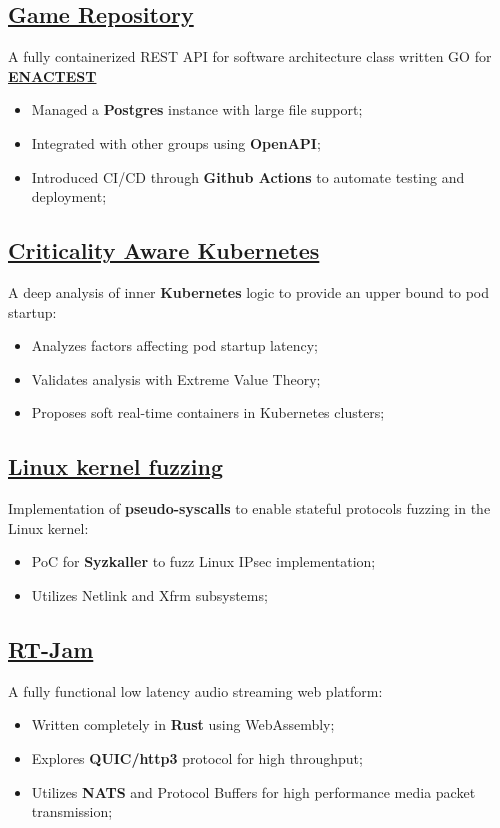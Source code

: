 \documentclass[10pt,a4paper]{article}
\begin{document}
 \subsection{\href{https://github.com/alarmfox/game-repository}{Game Repository}} A fully containerized REST API for software architecture class written GO for \textbf{\href{https://enactest-project.eu/}{ENACTEST}}
 \begin{itemize}
   \item Managed a \textbf{Postgres} instance with large file support;
  \item Integrated with other groups using \textbf{OpenAPI};
  \item Introduced CI/CD through \textbf{Github Actions} to automate testing and deployment;
 \end{itemize}

  \subsection{\href{https://github.com/alarmfox/criticality-aware-kubernetes}{Criticality Aware Kubernetes}}
  A deep analysis of inner \textbf{Kubernetes} logic to provide an upper bound to pod startup:
  \begin{itemize}
    \item Analyzes factors affecting pod startup latency;
    \item Validates analysis with Extreme Value Theory;
    \item Proposes soft real-time containers in Kubernetes clusters;
  \end{itemize}

  \subsection{\href{https://github.com/alarmfox/progetto-software-security}{Linux kernel fuzzing}}
  Implementation of \textbf{pseudo-syscalls} to enable stateful protocols fuzzing in the Linux kernel:
  \begin{itemize}
    \item PoC for \textbf{Syzkaller} to fuzz Linux IPsec implementation;
    \item Utilizes Netlink and Xfrm subsystems;
  \end{itemize}

  \subsection{\href{https://github.com/alarmfox/rt-jam}{RT-Jam}}
  A fully functional low latency audio streaming web platform:
  \begin{itemize}
    \item Written completely in \textbf{Rust} using WebAssembly;
    \item Explores \textbf{QUIC/http3} protocol for high throughput;
    \item Utilizes \textbf{NATS} and Protocol Buffers for high performance media packet transmission;
  \end{itemize}
\end{document}
